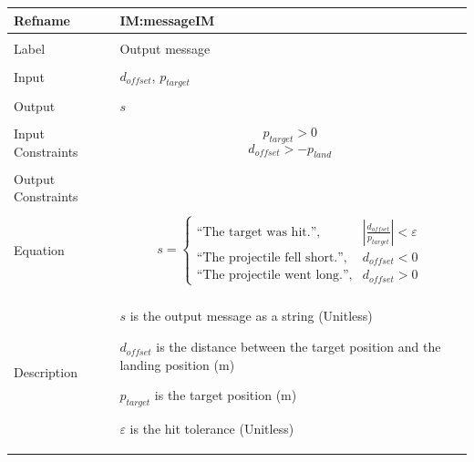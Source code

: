 \documentclass[12pt]{article}
\begin{document}
\noindent \begin{minipage}{\textwidth}
\begin{tabular}{>{\raggedright}p{}>{\raggedright\arraybackslash}p{}}
\toprule \textbf{Refname} & \textbf{IM:messageIM}
\label{IM:messageIM}
\\ \midrule \\
Label & Output message
\\ \midrule \\
Input & ${d_{offset}}$, ${p_{target}}$
\\ \midrule \\
Output & $s$
\\ \midrule \\
Input Constraints & \begin{displaymath}
                    {p_{target}}>0
                    \end{displaymath}
                    \begin{displaymath}
                    {d_{offset}}>-{p_{land}}
                    \end{displaymath}
\\ \midrule \\
Output Constraints & 
\\ \midrule \\
Equation & \begin{displaymath}
           s=\begin{cases}
             \text{``The target was hit.''}, & |\frac{{d_{offset}}}{{p_{target}}}|<ε\\
\text{``The projectile fell short.''}, & {d_{offset}}<0\\
\text{``The projectile went long.''}, & {d_{offset}}>0
             \end{cases}
           \end{displaymath}
\\ \midrule \\
Description & \begin{symbDescription}
              \item{$s$ is the output message as a string (Unitless)}
              \item{${d_{offset}}$ is the distance between the target position and the landing position (m)}
              \item{${p_{target}}$ is the target position (m)}
              \item{$ε$ is the hit tolerance (Unitless)}
              \end{symbDescription}

\end{tabular}
\end{minipage}
\end{document}
